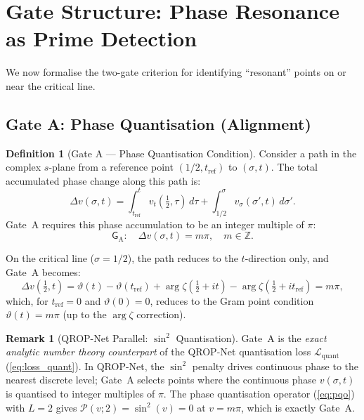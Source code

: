 \documentclass[11pt, a4paper]{article}
\theoremstyle{definition}
\newtheorem{definition}{Definition}[section]
\newtheorem{remark}{Remark}[section]
\theoremstyle{plain}
\newcommand{\GateA}{\mathsf{G}_{\mathrm{A}}}
\begin{document}
\section{Gate Structure: Phase Resonance as Prime Detection}
\label{sec:gates}

We now formalise the two-gate criterion for identifying ``resonant''
points on or near the critical line.

\subsection{Gate A: Phase Quantisation (Alignment)}

\begin{definition}[Gate A --- Phase Quantisation Condition]
\label{def:gate_a}
Consider a path in the complex $s$-plane from a reference point
$(1/2, t_{\mathrm{ref}})$ to $(\sigma, t)$. The total accumulated
phase change along this path is:
\begin{equation}
  \Delta v(\sigma, t) = \int_{t_{\mathrm{ref}}}^{t}
  v_t(\tfrac{1}{2}, \tau)\,d\tau +
  \int_{1/2}^{\sigma}v_\sigma(\sigma', t)\,d\sigma'.
  \label{eq:phase_accumulation}
\end{equation}
Gate~A requires this phase accumulation to be an integer multiple of $\pi$:
\begin{equation}
\boxed{
  \GateA: \quad \Delta v(\sigma, t) = m\pi, \quad m \in \mathbb{Z}.
}
\label{eq:gate_a}
\end{equation}
\end{definition}

On the critical line ($\sigma = 1/2$), the path reduces to the
$t$-direction only, and Gate~A becomes:
\begin{equation}
  \Delta v(\tfrac{1}{2}, t) =
  \vartheta(t) - \vartheta(t_{\mathrm{ref}}) +
  \arg\zeta(\tfrac{1}{2}+it) - \arg\zeta(\tfrac{1}{2}+it_{\mathrm{ref}})
  = m\pi,
  \label{eq:gate_a_critical}
\end{equation}
which, for $t_{\mathrm{ref}} = 0$ and $\vartheta(0) = 0$, reduces to
the Gram point condition $\vartheta(t) = m\pi$ (up to the $\arg\zeta$
correction).

\begin{remark}[QROP-Net Parallel: $\sin^2$ Quantisation]
\label{rem:gate_a_parallel}
Gate~A is the \textit{exact analytic number theory counterpart} of the
QROP-Net quantisation loss $\mathcal{L}_{\mathrm{quant}}$
(\cref{eq:loss_quant}). In QROP-Net, the $\sin^2$ penalty drives
continuous phase to the nearest discrete level; Gate~A selects points
where the continuous phase $v(\sigma,t)$ is quantised to integer
multiples of $\pi$. The phase quantisation operator
(\cref{eq:pqo}) with $L=2$ gives $\mathcal{P}(v; 2) =
\sin^2(v) = 0$ at $v = m\pi$, which is exactly Gate~A.
\end{remark}
\end{document}
